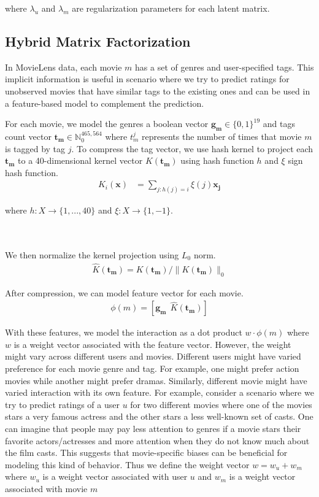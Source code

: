 \documentclass{article} %
\newcommand{\kernel}{K}
\begin{document}
	where $\lambda_u$ and $\lambda_m$  are regularization parameters for each latent matrix.


	\subsection{Hybrid Matrix Factorization}

	In MovieLens data, each movie $m$ has a set of genres and user-specified
	tags. This implicit information is useful in scenario where we try to
	predict ratings for unobserved movies that have similar tags to the existing
	ones and can be used in a feature-based model to complement the prediction.

	For each movie, we model the genres a boolean vector $\bm{g_m} \in
	\{0,1\}^{19}$ and tags count vector $\bm{t_m} \in \mathbb{N}_0^{465,564}$ where
	$t_m^j$ represents the number of times that movie $m$ is tagged by tag $j$.  To
	compress the tag vector, we use hash kernel to project each
	$\bm{t_m}$ to a 40-dimensional kernel vector $\kernel(\bm{t_m})$ using hash
	function $h$ and $\xi$ sign hash function.
	\begin{align}
		\kernel_i(\bm{x}) &= \sum_{j:h(j)=i} \xi(j) \bm{x_j}
	\end{align}
	\begin{center}
	where $h: X \rightarrow \{1, ..., 40\}$ and $\xi: X \rightarrow \{1,-1\}$.
	\end{center}
	\\
	\\
	We then normalize the kernel projection using $L_0$ norm.
	\begin{align}
		\hat{\kernel}(\bm{t_m}) = \kernel(\bm{t_m}) / \|\kernel(\bm{t_m})\|_0
	\end{align}

	After compression, we can model feature vector for each movie.
	\begin{align}
		\phi(m) = [\bm{g_m}\ \ \hat{\kernel}(\bm{t_m})]
	\end{align}

	With these features, we model the interaction as a dot product $w \cdot
	\phi(m)$ where $w$ is a weight vector associated with the feature vector.
	However, the weight might vary across different users and movies. Different
	users might have varied preference for each movie genre and tag. For
	example, one might prefer action movies while another might prefer dramas.
	Similarly, different movie might have varied interaction with its own
	feature. For example, consider a scenario where we try to predict ratings of
	a user $u$ for two different movies where one of the movies stars a very
	famous actress and the other stars a less well-known set of casts. One can
	imagine that people may pay less attention to genres if a movie stars their
	favorite actors/actresses and more attention when they do not know much
	about the film casts. This suggests that movie-specific biases can be
	beneficial for modeling this kind of behavior.  Thus we define the weight
	vector $w = w_u + w_m$ where $w_u$ is a weight vector associated with user
	$u$ and  $w_m$ is a weight vector associated with movie $m$
\end{document}
